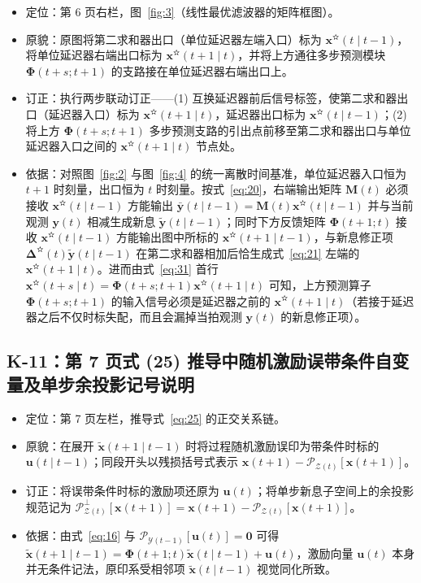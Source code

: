 \begin{itemize}
\item 定位：第 6 页右栏，图~\ref{fig:3}（线性最优滤波器的矩阵框图）。
\item 原貌：原图将第二求和器出口（单位延迟器左端入口）标为 $\bm{x}^{\text{✫}}(t \mid t - 1)$，将单位延迟器右端出口标为 $\bm{x}^{\text{✫}}(t + 1 \mid t)$，并将上方通往多步预测模块 $\bm{\Phi}(t + s; t + 1)$ 的支路接在单位延迟器右端出口上。
\item 订正：执行两步联动订正——(1) 互换延迟器前后信号标签，使第二求和器出口（延迟器入口）标为 $\bm{x}^{\text{✫}}(t + 1 \mid t)$，延迟器出口标为 $\bm{x}^{\text{✫}}(t \mid t - 1)$；(2) 将上方 $\bm{\Phi}(t + s; t + 1)$ 多步预测支路的引出点前移至第二求和器出口与单位延迟器入口之间的 $\bm{x}^{\text{✫}}(t + 1 \mid t)$ 节点处。
\item 依据：对照图~\ref{fig:2} 与图~\ref{fig:4} 的统一离散时间基准，单位延迟器入口恒为 $t + 1$ 时刻量，出口恒为 $t$ 时刻量。按式~\eqref{eq:20}，右端输出矩阵 $\bm{M}(t)$ 必须接收 $\bm{x}^{\text{✫}}(t \mid t - 1)$ 方能输出 $\bar{\bm{y}}(t \mid t - 1) = \bm{M}(t)\bm{x}^{\text{✫}}(t \mid t - 1)$ 并与当前观测 $\bm{y}(t)$ 相减生成新息 $\tilde{\bm{y}}(t \mid t - 1)$；同时下方反馈矩阵 $\bm{\Phi}(t + 1; t)$ 接收 $\bm{x}^{\text{✫}}(t \mid t - 1)$ 方能输出图中所标的 $\bm{x}^{\text{✫}}(t + 1 \mid t - 1)$，与新息修正项 $\bm{\Delta}^{\text{✫}}(t)\tilde{\bm{y}}(t \mid t - 1)$ 在第二求和器相加后恰生成式~\eqref{eq:21} 左端的 $\bm{x}^{\text{✫}}(t + 1 \mid t)$。进而由式~\eqref{eq:31} 首行 $\bm{x}^{\text{✫}}(t + s \mid t) = \bm{\Phi}(t + s; t + 1)\bm{x}^{\text{✫}}(t + 1 \mid t)$ 可知，上方预测算子 $\bm{\Phi}(t + s; t + 1)$ 的输入信号必须是延迟器之前的 $\bm{x}^{\text{✫}}(t + 1 \mid t)$（若接于延迟器之后不仅时标失配，而且会漏掉当拍观测 $\bm{y}(t)$ 的新息修正项）。
\end{itemize}

\subsection{K-11：第 7 页式 (25) 推导中随机激励误带条件自变量及单步余投影记号说明}\label{sec:k11}

\begin{itemize}
\item 定位：第 7 页左栏，推导式~\eqref{eq:25} 的正交关系链。
\item 原貌：在展开 $\tilde{\bm{x}}(t + 1 \mid t - 1)$ 时将过程随机激励误印为带条件时标的 $\bm{u}(t \mid t - 1)$；同段开头以残损括号式表示 $\bm{x}(t + 1) - \mathscr{P}_{\mathcal{Z}(t)}[\bm{x}(t + 1)]$。
\item 订正：将误带条件时标的激励项还原为 $\bm{u}(t)$；将单步新息子空间上的余投影规范记为 $\mathscr{P}_{\mathcal{Z}(t)}^{\perp}[\bm{x}(t + 1)] = \bm{x}(t + 1) - \mathscr{P}_{\mathcal{Z}(t)}[\bm{x}(t + 1)]$。
\item 依据：由式~\eqref{eq:16} 与 $\mathscr{P}_{\mathcal{Y}(t-1)}[\bm{u}(t)] = \bm{0}$ 可得 $\tilde{\bm{x}}(t + 1 \mid t - 1) = \bm{\Phi}(t + 1; t)\tilde{\bm{x}}(t \mid t - 1) + \bm{u}(t)$，激励向量 $\bm{u}(t)$ 本身并无条件记法，原印系受相邻项 $\tilde{\bm{x}}(t \mid t - 1)$ 视觉同化所致。
\end{itemize}

